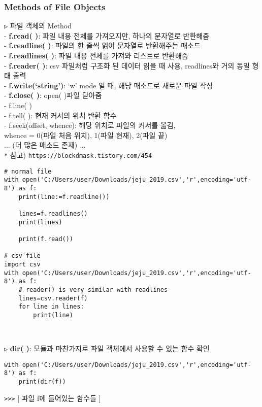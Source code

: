 \documentclass[11pt,a4paper]{article}
\begin{document}
\subsubsection{\Large\textbf{Methods of File Objects}}
\begin{spacing}{1.5}
\texttt{▷} 파일 객체의 Method\\
-  \textbf{f.read( )}: 파일 내용 전체를 가져오지만, 하나의 문자열로 반환해줌\\
-  \textbf{f.readline( )}: 파일의 한 줄씩 읽어 문자열로 반환해주는 매소드\\
-  \textbf{f.readlines( )}: 파일 내용 전체를 가져와 리스트로 반환해줌\\
-  \textbf{f.reader( )}: csv 파일처럼 구조화 된 데이터 읽을 때 사용, readlines와 거의 동일 형태 출력\\
-  \textbf{f.write(`string')}: `w' mode 일 때, 해당 매소드로 새로운 파일 작성\\
-  \textbf{f.close( )}: open( )파일 닫아줌\\
-  f.line( )\\
-  f.tell( ): 현재 커서의 위치 반환 함수\\
-  f.seek(offset, whence): 해당 위치로 파일의 커서를 옮김,\\
\hspace*{1em}whence = 0(파일 처음 위치), 1(파일 현재), 2(파일 끝)\\

... (더 많은 매소드 존재) ...\\

\texttt{*} 참고)   \verb|https://blockdmask.tistory.com/454|

\begin{lstlisting}[label={list:first},caption=file]
# normal file
with open('C:/Users/user/Downloads/jeju_2019.csv','r',encoding='utf-8') as f:
    print(line:=f.readline())

    lines=f.readlines()
    print(lines)

    print(f.read())

# csv file
import csv
with open('C:/Users/user/Downloads/jeju_2019.csv','r',encoding='utf-8') as f:
    # reader() is very similar with readlines
    lines=csv.reader(f)
    for line in lines:
        print(line)
\end{lstlisting}
\end{spacing}\\

\begin{spacing}{1.5}
\texttt{▷} \textbf{dir( )}: 모듈과 마찬가지로 파일 객체에서 사용할 수 있는 함수 확인
\begin{lstlisting}[label={list:first}]
with open('C:/Users/user/Downloads/jeju_2019.csv','r',encoding='utf-8') as f:
    print(dir(f))
\end{lstlisting}
\end{spacing}
\verb|>>>| [ 파일 f에 들어있는 함수들 ]\\
\end{document}
